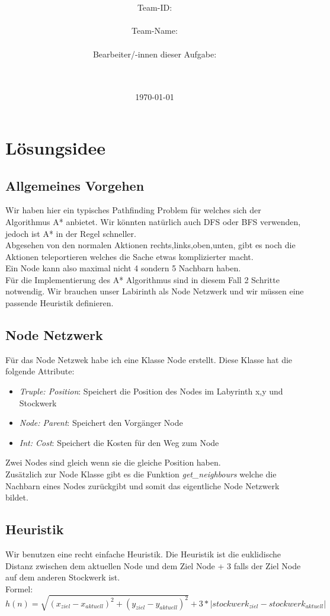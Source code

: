 \documentclass[a4paper,10pt,ngerman]{scrartcl}
\title{\textbf{\Huge\Aufgabe}}
\author{\LARGE Team-ID: \LARGE \TeamId \\\\
	    \LARGE Team-Name: \LARGE \TeamName \\\\
	    \LARGE Bearbeiter/-innen dieser Aufgabe: \\ 
	    \LARGE \Namen\\\\}
\date{\LARGE\today}
\begin{document}
\maketitle
\tableofcontents

\vspace{0.5cm}


\section{Lösungsidee}
\label{Lösungsidee}\label{sec:loesungsidee}
\subsection{Allgemeines Vorgehen}
Wir haben hier ein typisches Pathfinding Problem für welches sich der Algorithmus A* anbietet. Wir könnten natürlich auch DFS oder BFS verwenden, jedoch ist A* in der Regel schneller.\\
Abgesehen von den normalen Aktionen rechts,links,oben,unten, gibt es noch die Aktionen teleportieren welches die Sache etwas komplizierter macht.\\
Ein Node kann also maximal nicht 4 sondern 5 Nachbarn haben.\\
Für die Implementierung des A* Algorithmus sind in diesem Fall 2 Schritte notwendig. Wir brauchen unser Labirinth als Node Netzwerk und wir müssen eine passende Heuristik definieren.
\subsection{Node Netzwerk}
\label{Node Netzwerk}\label{sec:node}
Für das Node Netzwek habe ich eine Klasse Node erstellt. Diese Klasse hat die folgende Attribute:
\begin{itemize}
  \item \emph{Truple: Position}: Speichert die Position des Nodes im Labyrinth x,y und Stockwerk
  \item \emph{Node: Parent}: Speichert den Vorgänger Node
  \item \emph{Int: Cost}: Speichert die Kosten für den Weg zum Node
\end{itemize}
Zwei Nodes sind gleich wenn sie die gleiche Position haben.\\
Zusätzlich zur Node Klasse gibt es die Funktion \emph{get\_neighbours} welche die Nachbarn eines Nodes zurückgibt und somit das eigentliche Node Netzwerk bildet.\\

\subsection{Heuristik}
\label{Heuristik}\label{sec:heuristik}
Wir benutzen eine recht einfache Heuristik. Die Heuristik ist die euklidische Distanz zwischen dem aktuellen Node und dem Ziel Node + 3 falls der Ziel Node auf dem anderen Stockwerk ist.\\
Formel: $h(n) = \sqrt{(x_{ziel}-x_{aktuell})^2+(y_{ziel}-y_{aktuell})^2} + 3 * |stockwerk_{ziel}-stockwerk_{aktuell}|$\\
\end{document}
